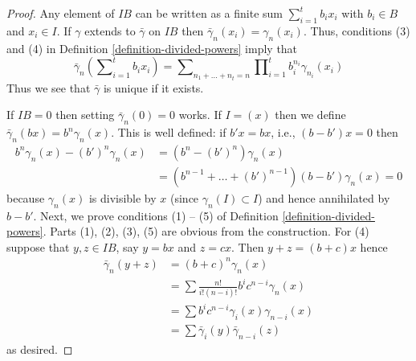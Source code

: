 \documentclass{stacks-project}
\theoremstyle{plain}
\theoremstyle{definition}
\theoremstyle{remark}
\numberwithin{equation}{subsection}
\begin{document}
\begin{proof}
Any element of $IB$ can be written as a finite sum
$\sum\nolimits_{i=1}^t b_ix_i$ with
$b_i \in B$ and $x_i \in I$. If $\gamma$ extends to $\bar\gamma$ on $IB$
then $\bar\gamma_n(x_i) = \gamma_n(x_i)$.
Thus, conditions (3) and (4) in
Definition \ref{definition-divided-powers} imply that
$$
\bar\gamma_n(\sum\nolimits_{i=1}^t b_ix_i) =
\sum\nolimits_{n_1 + \ldots + n_t = n}
\prod\nolimits_{i = 1}^t b_i^{n_i}\gamma_{n_i}(x_i)
$$
Thus we see that $\bar\gamma$ is unique if it exists.

\medskip\noindent
If $IB = 0$ then setting $\bar\gamma_n(0) = 0$ works. If $I = (x)$
then we define $\bar\gamma_n(bx) = b^n\gamma_n(x)$. This is well defined:
if $b'x = bx$, i.e., $(b - b')x = 0$ then
\begin{align*}
b^n\gamma_n(x) - (b')^n\gamma_n(x)
& =
(b^n - (b')^n)\gamma_n(x) \\
& =
(b^{n - 1} + \ldots + (b')^{n - 1})(b - b')\gamma_n(x) = 0
\end{align*}
because $\gamma_n(x)$ is divisible by $x$ (since
$\gamma_n(I) \subset I$) and hence annihilated by $b - b'$.
Next, we prove conditions (1) -- (5) of
Definition \ref{definition-divided-powers}.
Parts (1), (2), (3), (5) are obvious from the construction.
For (4) suppose that $y, z \in IB$, say $y = bx$ and $z = cx$. Then
$y + z = (b + c)x$ hence
\begin{align*}
\bar\gamma_n(y + z)
& =
(b + c)^n\gamma_n(x) \\
& =
\sum \frac{n!}{i!(n - i)!}b^ic^{n -i}\gamma_n(x) \\
& =
\sum b^ic^{n - i}\gamma_i(x)\gamma_{n - i}(x) \\
& =
\sum \bar\gamma_i(y)\bar\gamma_{n -i}(z)
\end{align*}
as desired.


\end{proof}
\end{document}

